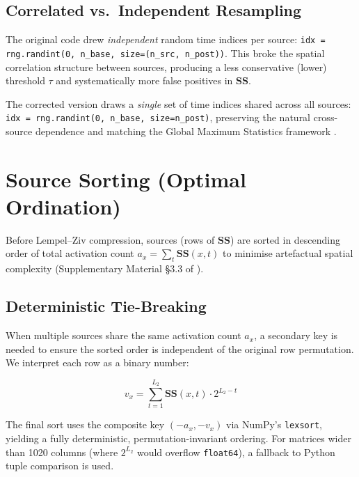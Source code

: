 \documentclass[11pt,a4paper]{article}
\begin{document}
\subsection{Correlated vs.\ Independent Resampling}

\begin{tcolorbox}[title={Critical Fix: Correlated Bootstrap}, colback=red!3, colframe=cRed!70]
The original code drew \emph{independent} random time indices per source:
\texttt{idx = rng.randint(0, n\_base, size=(n\_src, n\_post))}. This broke the spatial
correlation structure between sources, producing a less conservative (lower) threshold
$\tau$ and systematically more false positives in $\mathbf{SS}$.

The corrected version draws a \emph{single} set of time indices shared across all sources:
\texttt{idx = rng.randint(0, n\_base, size=n\_post)}, preserving the natural cross-source
dependence and matching the Global Maximum Statistics framework \cite{nichols2002}.
\end{tcolorbox}

\section{Source Sorting (Optimal Ordination)}
\label{sec:sorting}

Before Lempel--Ziv compression, sources (rows of $\mathbf{SS}$) are sorted in descending
order of total activation count $a_x = \sum_t \mathbf{SS}(x, t)$ to minimise artefactual
spatial complexity (Supplementary Material \S3.3 of \cite{casali2013}).

\subsection{Deterministic Tie-Breaking}

When multiple sources share the same activation count $a_x$, a secondary key is needed to
ensure the sorted order is independent of the original row permutation. We interpret each
row as a binary number:

\begin{equation}
  v_x = \sum_{t=1}^{L_2} \mathbf{SS}(x, t) \cdot 2^{L_2 - t}
  \label{eq:rowvalue}
\end{equation}

The final sort uses the composite key $(-a_x, -v_x)$ via NumPy's \texttt{lexsort}, yielding
a fully deterministic, permutation-invariant ordering. For matrices wider than 1020 columns
(where $2^{L_2}$ would overflow \texttt{float64}), a fallback to Python tuple comparison is used.
\end{document}
